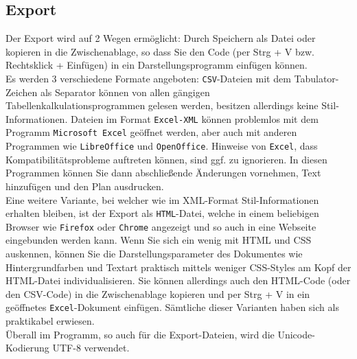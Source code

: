 \documentclass[a4paper,11pt]{article}
\begin{document}
\subsection{Export}
Der Export wird auf 2 Wegen ermöglicht: Durch Speichern als Datei oder kopieren in die Zwischenablage, so dass Sie den Code (per Strg + V bzw. Rechtsklick + Einfügen) in ein Darstellungsprogramm einfügen können.\\
Es werden 3 verschiedene Formate angeboten: \texttt{CSV}-Dateien mit dem Tabulator-Zeichen als Separator können von allen gängigen Tabellenkalkulationsprogrammen gelesen werden, besitzen allerdings keine Stil-Informationen. Dateien im Format \texttt{Excel-XML} können problemlos mit dem Programm \texttt{Microsoft Excel} geöffnet werden, aber auch mit anderen Programmen wie \texttt{LibreOffice} und \texttt{OpenOffice}. Hinweise von \texttt{Excel}, dass Kompatibilitätsprobleme auftreten können, sind ggf. zu ignorieren. In diesen Programmen können Sie dann abschließende Änderungen vornehmen, Text hinzufügen und den Plan ausdrucken.\\ 
Eine weitere Variante, bei welcher wie im XML-Format Stil-Informationen erhalten bleiben, ist der Export als \texttt{HTML}-Datei, welche in einem beliebigen Browser wie \texttt{Firefox} oder \texttt{Chrome} angezeigt und so auch in eine Webseite eingebunden werden kann. Wenn Sie sich ein wenig mit HTML und CSS auskennen, können Sie die Darstellungsparameter des Dokumentes wie Hintergrundfarben und Textart praktisch mittels weniger CSS-Styles am Kopf der HTML-Datei individualisieren. Sie können allerdings auch den HTML-Code (oder den CSV-Code) in die Zwischenablage kopieren und per Strg + V in ein geöffnetes \texttt{Excel}-Dokument einfügen. Sämtliche dieser Varianten haben sich als praktikabel erwiesen.\\
Überall im Programm, so auch für die Export-Dateien, wird die Unicode-Kodierung UTF-8 verwendet.
\end{document}

